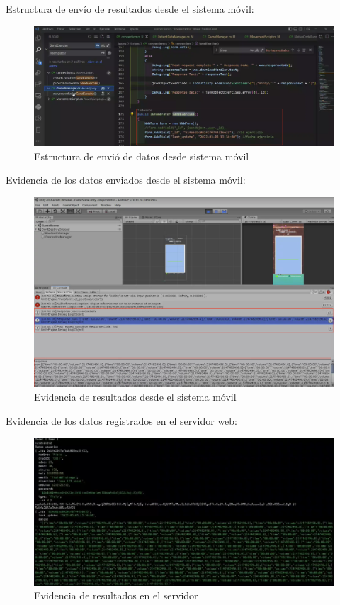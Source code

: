 \documentclass[12pt]{article}
\begin{document}
Estructura de envío de resultados desde el sistema móvil:

\begin{figure}[ht]
\centering
\includegraphics[scale=0.3]{imag/TESTMobileenviodatos.png}
\caption{Estructura de envió de datos desde sistema móvil }
\label{49}
\end{figure}
\FloatBarrier


Evidencia de los datos enviados desde el sistema móvil:

\begin{figure}[ht]
\centering
\includegraphics[scale=0.3]{imag/TESTmovildatosevidenciados.png}
\caption{Evidencia de resultados desde el sistema móvil }
\label{50}
\end{figure}
\FloatBarrier

Evidencia de los datos registrados en el servidor web:
\begin{figure}[ht]
\centering
\includegraphics[scale=0.25]{imag/TESTmobileconsoleresults.png}
\caption{Evidencia de resultados en el servidor }
\label{51}
\end{figure}
\FloatBarrier
\end{document}
